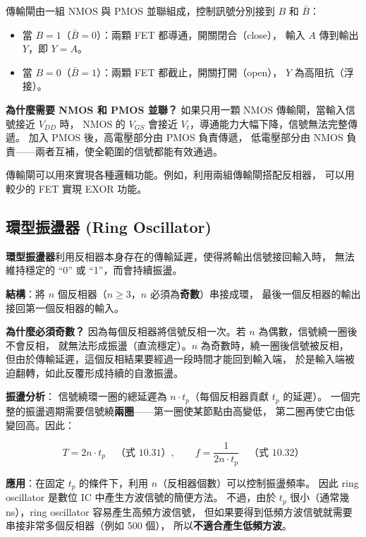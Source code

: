 \documentclass[12pt]{article}
\begin{document}
傳輸閘由一組 NMOS 與 PMOS 並聯組成，控制訊號分別接到 $B$ 和 $\bar{B}$：

\begin{itemize}[leftmargin=2.2em,itemsep=2pt]
  \item 當 $B = 1$（$\bar{B} = 0$）：兩顆 FET 都導通，開關閉合（close），
    輸入 $A$ 傳到輸出 $Y$，即 $Y = A$。
  \item 當 $B = 0$（$\bar{B} = 1$）：兩顆 FET 都截止，開關打開（open），
    $Y$ 為高阻抗（浮接）。
\end{itemize}

\textbf{為什麼需要 NMOS 和 PMOS 並聯？}
如果只用一顆 NMOS 傳輸閘，當輸入信號接近 $V_{DD}$ 時，
NMOS 的 $V_{GS}$ 會接近 $V_t$，導通能力大幅下降，信號無法完整傳遞。
加入 PMOS 後，高電壓部分由 PMOS 負責傳遞，
低電壓部分由 NMOS 負責——兩者互補，使全範圍的信號都能有效通過。

傳輸閘可以用來實現各種邏輯功能。例如，利用兩組傳輸閘搭配反相器，
可以用較少的 FET 實現 EXOR 功能。

\subsection*{環型振盪器 (Ring Oscillator)}


\textbf{環型振盪器}利用反相器本身存在的傳輸延遲，使得將輸出信號接回輸入時，
無法維持穩定的 ``0'' 或 ``1''，而會持續振盪。

\textbf{結構}：將 $n$ 個反相器（$n \ge 3$，$n$ 必須為\textbf{奇數}）串接成環，
最後一個反相器的輸出接回第一個反相器的輸入。

\textbf{為什麼必須奇數？}
因為每個反相器將信號反相一次。若 $n$ 為偶數，信號繞一圈後不會反相，
就無法形成振盪（直流穩定）。$n$ 為奇數時，繞一圈後信號被反相，
但由於傳輸延遲，這個反相結果要經過一段時間才能回到輸入端，
於是輸入端被迫翻轉，如此反覆形成持續的自激振盪。

\textbf{振盪分析}：
信號繞環一圈的總延遲為 $n \cdot t_p$（每個反相器貢獻 $t_p$ 的延遲）。
一個完整的振盪週期需要信號繞\textbf{兩圈}——第一圈使某節點由高變低，
第二圈再使它由低變回高。因此：

\begin{formulabox}
\[
  T = 2n \cdot t_p \quad\text{（式 10.31）},\qquad
  f = \frac{1}{2n \cdot t_p} \quad\text{（式 10.32）}
\]
\end{formulabox}

\textbf{應用}：在固定 $t_p$ 的條件下，利用 $n$（反相器個數）可以控制振盪頻率。
因此 ring oscillator 是數位 IC 中產生方波信號的簡便方法。
不過，由於 $t_p$ 很小（通常幾 ns），ring oscillator 容易產生高頻方波信號，
但如果要得到低頻方波信號就需要串接非常多個反相器（例如 500 個），
所以\textbf{不適合產生低頻方波}。
\end{document}
